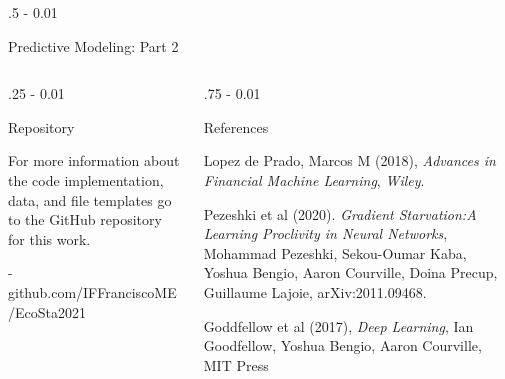 \documentclass{postertheme}\usepackage[]{graphicx}\usepackage[]{color}
\begin{document}
\begin{frame}
\begin{columns}[onlytextwidth]
\begin{column}{.5 \textwidth - 0.01 \textwidth}
\begin{block}{Predictive Modeling: Part 2}
    \end{block}
  \end{column}
  
\end{columns}


\begin{columns}[onlytextwidth]
  
  \begin{column}{.25 \textwidth - 0.01 \textwidth}
    \begin{block}{Repository}
        
        For more information about the code implementation, data, and file templates go to the GitHub
        repository for this work.
        
        - github.com/IFFranciscoME/EcoSta2021
        
    \end{block}
  \end{column}
  
  \begin{column}{.75 \textwidth - 0.01 \textwidth}
    \begin{block}{References}
    
    \begin{thebibliography}{02}
              Lopez de Prado, Marcos M (2018), \textit{Advances in Financial Machine Learning}, \emph{Wiley}.

               Pezeshki et al (2020). \textit{Gradient Starvation:A Learning Proclivity in Neural Networks},
               Mohammad Pezeshki, Sekou-Oumar Kaba, Yoshua Bengio, Aaron Courville, Doina Precup,
               Guillaume Lajoie, arXiv:2011.09468.
                                                     
               Goddfellow et al (2017), \textit{Deep Learning}, Ian Goodfellow, Yoshua Bengio,
               Aaron Courville, MIT Press
    \end{thebibliography}
    
    \end{block}
  \end{column}
\end{columns}


\end{frame}
\end{document}
